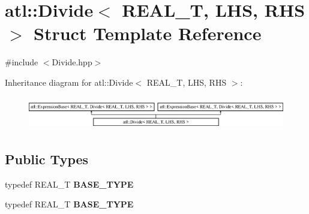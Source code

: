 \hypertarget{structatl_1_1_divide}{\section{atl\+:\+:Divide$<$ R\+E\+A\+L\+\_\+\+T, L\+H\+S, R\+H\+S $>$ Struct Template Reference}
\label{structatl_1_1_divide}
}


{\ttfamily \#include $<$Divide.\+hpp$>$}

Inheritance diagram for atl\+:\+:Divide$<$ R\+E\+A\+L\+\_\+\+T, L\+H\+S, R\+H\+S $>$\+:\begin{figure}[H]
\begin{center}
\leavevmode
\includegraphics[height=1.469816cm]{structatl_1_1_divide}
\end{center}
\end{figure}
\subsection*{Public Types}
\begin{DoxyCompactItemize}
\item 
\hypertarget{structatl_1_1_divide_abf953ef2ef62117bc7c276e1764ce2cd}{typedef R\+E\+A\+L\+\_\+\+T {\bfseries B\+A\+S\+E\+\_\+\+T\+Y\+P\+E}}\label{structatl_1_1_divide_abf953ef2ef62117bc7c276e1764ce2cd}

\item 
\hypertarget{structatl_1_1_divide_abf953ef2ef62117bc7c276e1764ce2cd}{typedef R\+E\+A\+L\+\_\+\+T {\bfseries B\+A\+S\+E\+\_\+\+T\+Y\+P\+E}}\label{structatl_1_1_divide_abf953ef2ef62117bc7c276e1764ce2cd}

\end{DoxyCompactItemize}
